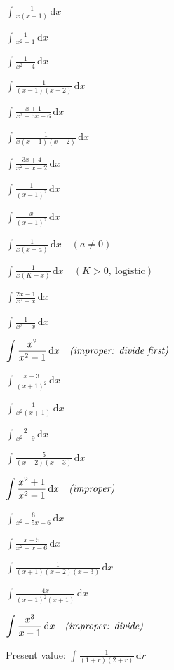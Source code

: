 \begin{problems}
  \item $\displaystyle\int \frac{1}{x(x-1)}\,\mathrm{d}x$
  \item $\displaystyle\int \frac{1}{x^{2}-1}\,\mathrm{d}x$
  \item $\displaystyle\int \frac{1}{x^{2}-4}\,\mathrm{d}x$
  \item $\displaystyle\int \frac{1}{(x-1)(x+2)}\,\mathrm{d}x$
  \item $\displaystyle\int \frac{x+1}{x^{2}-5x+6}\,\mathrm{d}x$
  \item $\displaystyle\int \frac{1}{x(x+1)(x+2)}\,\mathrm{d}x$
  \item $\displaystyle\int \frac{3x+4}{x^{2}+x-2}\,\mathrm{d}x$
  \item $\displaystyle\int \frac{1}{(x-1)^{2}}\,\mathrm{d}x$
  \item $\displaystyle\int \frac{x}{(x-1)^{2}}\,\mathrm{d}x$
  \item $\displaystyle\int \frac{1}{x(x-a)}\,\mathrm{d}x \quad (a\neq 0)$
  \item $\displaystyle\int \frac{1}{x(K-x)}\,\mathrm{d}x \quad (K>0,\ \text{logistic})$
  \item $\displaystyle\int \frac{2x-1}{x^{2}+x}\,\mathrm{d}x$
  \item $\displaystyle\int \frac{1}{x^{3}-x}\,\mathrm{d}x$
  \item $\displaystyle\int \frac{x^{2}}{x^{2}-1}\,\mathrm{d}x \quad \emph{(improper: divide first)}$
  \item $\displaystyle\int \frac{x+3}{(x+1)^{2}}\,\mathrm{d}x$
  \item $\displaystyle\int \frac{1}{x^{2}(x+1)}\,\mathrm{d}x$
  \item $\displaystyle\int \frac{2}{x^{2}-9}\,\mathrm{d}x$
  \item $\displaystyle\int \frac{5}{(x-2)(x+3)}\,\mathrm{d}x$
  \item $\displaystyle\int \frac{x^{2}+1}{x^{2}-1}\,\mathrm{d}x \quad \emph{(improper)}$
  \item $\displaystyle\int \frac{6}{x^{2}+5x+6}\,\mathrm{d}x$
  \item $\displaystyle\int \frac{x+5}{x^{2}-x-6}\,\mathrm{d}x$
  \item $\displaystyle\int \frac{1}{(x+1)(x+2)(x+3)}\,\mathrm{d}x$
  \item $\displaystyle\int \frac{4x}{(x-1)^{2}(x+1)}\,\mathrm{d}x$
  \item $\displaystyle\int \frac{x^{3}}{x-1}\,\mathrm{d}x \quad \emph{(improper: divide)}$
  \item Present value: $\displaystyle\int \frac{1}{(1+r)(2+r)}\,\mathrm{d}r$
\end{problems}

